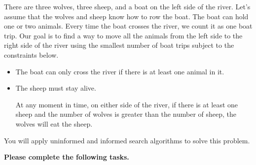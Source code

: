 \documentclass[12pt]{article}
\begin{document}
There are three wolves, three sheep, and a boat on the left side of the river. Let's assume that the wolves and sheep know how to row the boat. The boat can hold one or two animals. Every time the boat crosses the river, we count it as one boat trip. Our goal is to find a way to move all the animals from the left side to the right side of the river using the smallest number of boat trips subject to the constraints below. 
\begin{itemize}
\item
The boat can only cross the river if there is at least one animal in it. 
\item
The sheep must stay alive. 

At any moment in time, on either side of the river, if there is at least one sheep and the number of wolves is greater than the number of sheep, the wolves will eat the sheep.
\end{itemize}

You will apply uninformed and informed search algorithms to solve this problem. 

{\bf Please complete the following tasks.}
\end{document}
